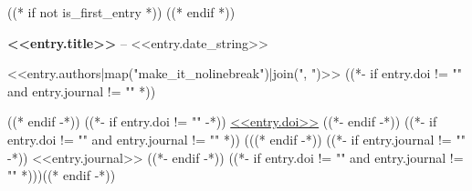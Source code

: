 ((* if not is_first_entry *))
\vspace{8pt}
((* endif *))

\textbf{<<entry.title>>} -- <<entry.date_string>>
\begin{highlights}
    \item <<entry.authors|map("make_it_nolinebreak")|join(", ")>>
    ((*- if entry.doi != "" and entry.journal != "" *)) \item ((* endif -*))
    ((*- if entry.doi != "" -*))
    \href{<<entry.doi_url>>}{<<entry.doi>>}
    ((*- endif -*))
    ((*- if entry.doi != "" and entry.journal != "" *)) (((* endif -*))
    ((*- if entry.journal != "" -*))
    <<entry.journal>>
    ((*- endif -*))
    ((*- if entry.doi != "" and entry.journal != "" *)))((* endif -*))
\end{highlights}
